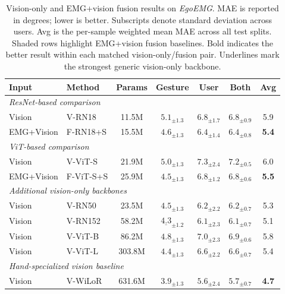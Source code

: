 \documentclass{article}
\newcommand{\dataset}{\textit{EgoEMG}}
\begin{document}
\begin{table}[t]
\centering
\caption{Vision-only and EMG+vision fusion results on \dataset{}.
MAE is reported in degrees; lower is better.
Subscripts denote standard deviation across users.
Avg is the per-sample weighted mean MAE across all test splits. Shaded rows
highlight EMG+vision fusion baselines. Bold indicates the better result within
each matched vision-only/fusion pair. Underlines mark the strongest generic
vision-only backbone.}
\label{tab:egoemg_results}
\footnotesize
\setlength{\tabcolsep}{3.5pt}
\renewcommand{\arraystretch}{1.05}
\begin{tabular}{llccccc}
\toprule
Input & Method & Params & Gesture & User & Both & Avg \\
\midrule
\multicolumn{7}{l}{\textit{ResNet-based comparison}} \\
\midrule
Vision & V-RN18
& 11.5M
& $5.1_{\pm1.3}$
& $6.8_{\pm1.7}$
& $6.8_{\pm0.9}$
& 5.9 \\
\rowcolor{green!8}
EMG+Vision & F-RN18+S
& 15.5M
& $\mathbf{4.6}_{\pm1.3}$
& $\mathbf{6.4}_{\pm1.4}$
& $\mathbf{6.4}_{\pm0.8}$
& \textbf{5.4} \\
\midrule
\multicolumn{7}{l}{\textit{ViT-based comparison}} \\
\midrule
Vision & V-ViT-S
& 21.9M
& $5.0_{\pm1.3}$
& $7.3_{\pm2.4}$
& $7.2_{\pm0.5}$
& 6.0 \\
\rowcolor{green!8}
EMG+Vision & F-ViT-S+S
& 25.9M
& $\mathbf{4.5}_{\pm1.3}$
& $\mathbf{6.8}_{\pm1.2}$
& $\mathbf{6.8}_{\pm0.6}$
& \textbf{5.5} \\
\midrule
\multicolumn{7}{l}{\textit{Additional vision-only backbones}} \\
\midrule
Vision & V-RN50
& 23.5M
& $4.5_{\pm1.3}$
& $6.2_{\pm2.2}$
& $6.2_{\pm0.7}$
& 5.3 \\
Vision & V-RN152
& 58.2M
& $\underline{4.3}_{\pm1.2}$
& $6.1_{\pm2.3}$
& $6.1_{\pm0.7}$
& 5.1 \\
Vision & V-ViT-B
& 86.2M
& $4.8_{\pm1.3}$
& $7.0_{\pm2.3}$
& $6.9_{\pm0.6}$
& 5.8 \\
Vision & V-ViT-L
& 303.8M
& $4.4_{\pm1.3}$
& $6.6_{\pm2.2}$
& $6.6_{\pm0.7}$
& 5.4 \\
\midrule
\multicolumn{7}{l}{\textit{Hand-specialized vision baseline}} \\
\midrule
Vision & V-WiLoR
& 631.6M
& $\mathbf{3.9}_{\pm1.3}$
& $\mathbf{5.6}_{\pm2.4}$
& $\mathbf{5.7}_{\pm0.7}$
& \textbf{4.7} \\
\bottomrule
\end{tabular}
\end{table}
\end{document}
